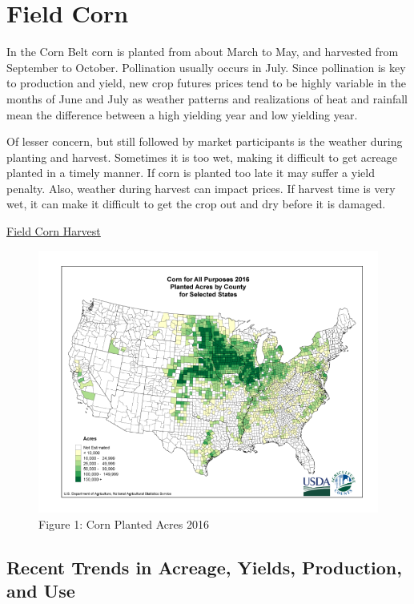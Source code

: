 \documentclass[]{book}
\theoremstyle{definition}
\theoremstyle{definition}
\theoremstyle{remark}
\begin{document}
\section{Field Corn}\label{field-corn}

In the Corn Belt corn is planted from about March to May, and harvested
from September to October. Pollination usually occurs in July. Since
pollination is key to production and yield, new crop futures prices tend
to be highly variable in the months of June and July as weather patterns
and realizations of heat and rainfall mean the difference between a high
yielding year and low yielding year.

Of lesser concern, but still followed by market participants is the
weather during planting and harvest. Sometimes it is too wet, making it
difficult to get acreage planted in a timely manner. If corn is planted
too late it may suffer a yield penalty. Also, weather during harvest can
impact prices. If harvest time is very wet, it can make it difficult to
get the crop out and dry before it is damaged.

\href{https://www.youtube.com/watch?v=zuGVeXqTIaM}{Field Corn Harvest}

\begin{figure}[htbp]
\centering
\includegraphics{images/Corn-PA-2016.png}
\caption{Figure 1: Corn Planted Acres 2016}
\end{figure}

\subsection{Recent Trends in Acreage, Yields, Production, and
Use}\label{recent-trends-in-acreage-yields-production-and-use}
\end{document}
